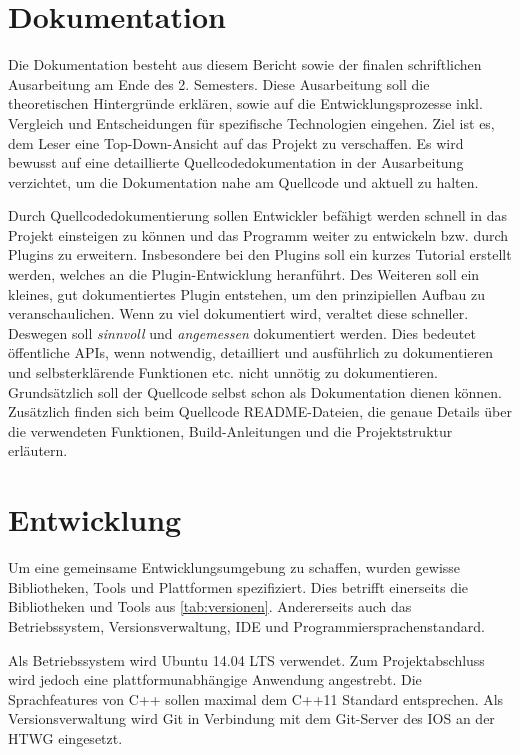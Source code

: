 \section{Dokumentation}

Die Dokumentation besteht aus diesem Bericht sowie der finalen schriftlichen Ausarbeitung am Ende des 2. Semesters.
Diese Ausarbeitung soll die theoretischen Hintergründe erklären, sowie auf die Entwicklungsprozesse inkl. Vergleich und Entscheidungen für spezifische Technologien eingehen.
Ziel ist es, dem Leser eine Top-Down-Ansicht auf das Projekt zu verschaffen.
Es wird bewusst auf eine detaillierte Quellcodedokumentation in der Ausarbeitung verzichtet, um die Dokumentation nahe am Quellcode und aktuell zu halten.

Durch Quellcodedokumentierung sollen Entwickler befähigt werden schnell in das Projekt einsteigen zu können und das Programm weiter zu entwickeln bzw. durch Plugins zu erweitern.
Insbesondere bei den Plugins soll ein kurzes Tutorial erstellt werden, welches an die Plugin-Entwicklung heranführt. 
Des Weiteren soll ein kleines, gut dokumentiertes Plugin entstehen, um den prinzipiellen Aufbau zu veranschaulichen.
Wenn zu viel dokumentiert wird, veraltet diese schneller.
Deswegen soll \emph{sinnvoll} und \emph{angemessen} dokumentiert werden.
Dies bedeutet öffentliche APIs, wenn notwendig, detailliert und ausführlich zu dokumentieren und selbsterklärende Funktionen etc. nicht unnötig zu dokumentieren.
Grundsätzlich soll der Quellcode selbst schon als Dokumentation dienen können.
Zusätzlich finden sich beim Quellcode README-Dateien, die genaue Details über die verwendeten Funktionen, Build-Anleitungen und die Projektstruktur erläutern.

\section{Entwicklung}

Um eine gemeinsame Entwicklungsumgebung zu schaffen, wurden gewisse Bibliotheken, Tools und Plattformen spezifiziert.
Dies betrifft einerseits die Bibliotheken und Tools aus \autoref{tab:versionen}.
Andererseits auch das Betriebssystem, Versionsverwaltung, IDE und Programmiersprachenstandard.

Als Betriebssystem wird Ubuntu 14.04 LTS verwendet. 
Zum Projektabschluss wird jedoch eine plattformunabhängige Anwendung angestrebt.
Die Sprachfeatures von C++ sollen maximal dem C++11 Standard entsprechen.
Als Versionsverwaltung wird Git in Verbindung mit dem Git-Server des IOS an der HTWG eingesetzt. 

